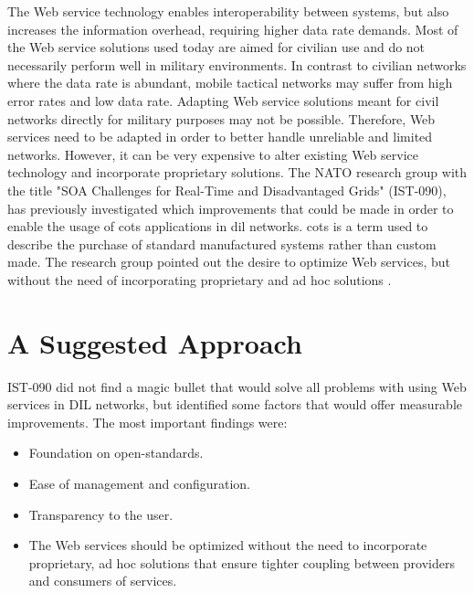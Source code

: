 The Web service technology enables interoperability between systems, but also
increases the information overhead, requiring higher data rate demands. Most of
the Web service solutions used today are aimed for civilian use and do not
necessarily perform well in military environments. In contrast to civilian
networks where the data rate is abundant, mobile tactical networks may suffer
from high error rates and low data rate. Adapting Web service solutions meant
for civil networks directly for military purposes may not be possible.
Therefore, Web services need to be adapted in order to better handle unreliable
and limited networks. However, it can be very expensive to alter existing Web
service technology and incorporate proprietary solutions. The NATO research
group with the title "SOA Challenges for Real-Time and Disadvantaged Grids"
(IST-090), has previously investigated which improvements that could be made in
order to enable the usage of \gls{cots} applications in \gls{dil} networks.
\Gls{cots} is a term used to describe the purchase of standard manufactured
systems rather than custom made. The research group pointed out the desire to
optimize Web services, but without the need of incorporating proprietary and ad
hoc solutions \cite{ist-090}.


\section{A Suggested Approach}
\label{section:hypothesis}

IST-090 did not find a magic bullet that would solve all problems with using Web
services in DIL networks, but identified some factors that would offer measurable
improvements. The most important findings were:

\begin{itemize}

    \item Foundation on open-standards.

    \item Ease of management and configuration.

    \item Transparency to the user.

    \item The Web services should be optimized without the need to incorporate
    proprietary, ad hoc solutions that ensure tighter coupling between providers
    and consumers of services.

\end{itemize}

